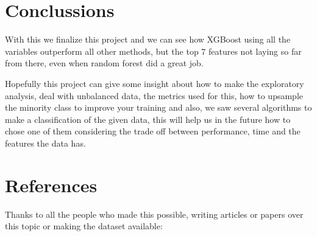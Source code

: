 \documentclass[
]{article}
\begin{document}
\hypertarget{conclussions}{%
\section{Conclussions}\label{conclussions}}

With this we finalize this project and we can see how XGBoost using all
the variables outperform all other methods, but the top 7 features not
laying so far from there, even when random forest did a great job.

Hopefully this project can give some insight about how to make the
exploratory analysis, deal with unbalanced data, the metrics used for
this, how to upsample the minority class to improve your training and
also, we saw several algorithms to make a classification of the given
data, this will help us in the future how to chose one of them
considering the trade off between performance, time and the features the
data has.

\newpage

\hypertarget{references}{%
\section{References}\label{references}}

Thanks to all the people who made this possible, writing articles or
papers over this topic or making the dataset available:
\end{document}
